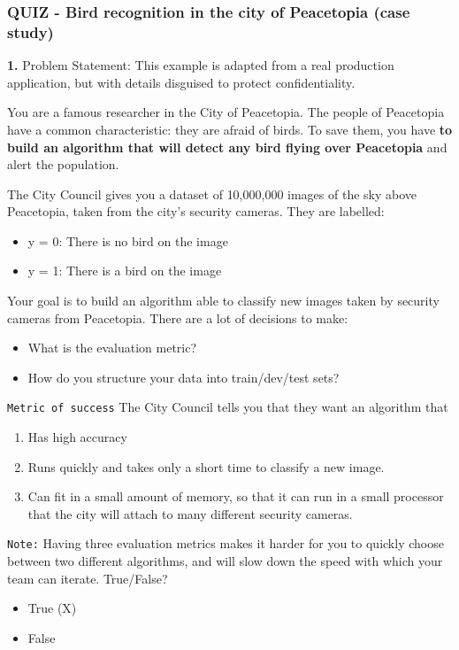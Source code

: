 \subsubsection*{QUIZ - Bird recognition in the city of Peacetopia (case study)}
\textbf{1.} Problem Statement: This example is adapted from a real production application, but with details disguised to protect confidentiality.

You are a famous researcher in the City of Peacetopia. The people of Peacetopia have a common characteristic: they are afraid of birds. To save them, you have \textbf{to build an algorithm that will detect any bird flying over Peacetopia} and alert the population.

The City Council gives you a dataset of 10,000,000 images of the sky above Peacetopia, taken from the city’s security cameras. They are labelled:
\begin{itemize}
    \item y = 0: There is no bird on the image
    \item y = 1: There is a bird on the image
\end{itemize}
Your goal is to build an algorithm able to classify new images taken by security cameras from Peacetopia. There are a lot of decisions to make:
\begin{itemize}
    \item What is the evaluation metric?
    \item How do you structure your data into train/dev/test sets?
\end{itemize}
\texttt{Metric of success}
The City Council tells you that they want an algorithm that
\begin{enumerate}
    \item Has high accuracy
    \item Runs quickly and takes only a short time to classify a new image.
    \item Can fit in a small amount of memory, so that it can run in a small processor that the city will attach to many different security cameras.
\end{enumerate}
\texttt{Note:} Having three evaluation metrics makes it harder for you to quickly choose between two different algorithms, and will slow down the speed with which your team can iterate. True/False?
\begin{itemize}
    \item True (X)
    \item False
\end{itemize}
